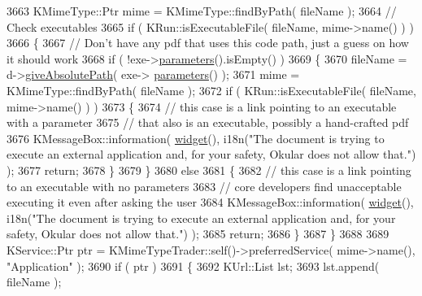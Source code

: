\begin{DoxyCode}
3663             KMimeType::Ptr mime = KMimeType::findByPath( fileName );
3664             \textcolor{comment}{// Check executables}
3665             \textcolor{keywordflow}{if} ( KRun::isExecutableFile( fileName, mime->name() ) )
3666             \{
3667                 \textcolor{comment}{// Don't have any pdf that uses this code path, just a guess on how it should work}
3668                 \textcolor{keywordflow}{if} ( !exe->\hyperlink{classOkular_1_1ExecuteAction_a5c2b9ecd8b20b9ff12edb792c04132ea}{parameters}().isEmpty() )
3669                 \{
3670                     fileName = d->\hyperlink{classOkular_1_1DocumentPrivate_a1c665a65d08f7b032bba757b298e26a6}{giveAbsolutePath}( exe->
      \hyperlink{classOkular_1_1ExecuteAction_a5c2b9ecd8b20b9ff12edb792c04132ea}{parameters}() );
3671                     mime = KMimeType::findByPath( fileName );
3672                     \textcolor{keywordflow}{if} ( KRun::isExecutableFile( fileName, mime->name() ) )
3673                     \{
3674                         \textcolor{comment}{// this case is a link pointing to an executable with a parameter}
3675                         \textcolor{comment}{// that also is an executable, possibly a hand-crafted pdf}
3676                         KMessageBox::information( \hyperlink{classOkular_1_1Document_aef26598eca4c2fe772cc77d7730a9e8b}{widget}(), i18n(\textcolor{stringliteral}{"The document is trying to execute
       an external application and, for your safety, Okular does not allow that."}) );
3677                         \textcolor{keywordflow}{return};
3678                     \}
3679                 \}
3680                 \textcolor{keywordflow}{else}
3681                 \{
3682                     \textcolor{comment}{// this case is a link pointing to an executable with no parameters}
3683                     \textcolor{comment}{// core developers find unacceptable executing it even after asking the user}
3684                     KMessageBox::information( \hyperlink{classOkular_1_1Document_aef26598eca4c2fe772cc77d7730a9e8b}{widget}(), i18n(\textcolor{stringliteral}{"The document is trying to execute an
       external application and, for your safety, Okular does not allow that."}) );
3685                     \textcolor{keywordflow}{return};
3686                 \}
3687             \}
3688 
3689             KService::Ptr ptr = KMimeTypeTrader::self()->preferredService( mime->name(), \textcolor{stringliteral}{"Application"} );
3690             \textcolor{keywordflow}{if} ( ptr )
3691             \{
3692                 KUrl::List lst;
3693                 lst.append( fileName );

\end{DoxyCode}
